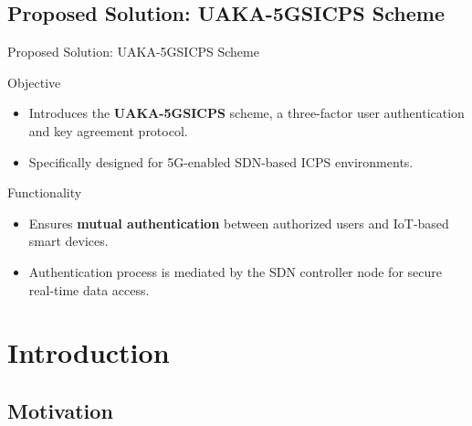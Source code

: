 \documentclass[9pt,handout]{beamer}
\begin{document}
\subsection{Proposed Solution: UAKA-5GSICPS Scheme}
\begin{frame}{Proposed Solution: UAKA-5GSICPS Scheme}

\begin{block}{Objective}
    \begin{itemize}
        \item Introduces the \textbf{UAKA-5GSICPS} scheme, a three-factor user authentication and key agreement protocol.
        \item Specifically designed for 5G-enabled SDN-based ICPS environments.
    \end{itemize}
\end{block}

\begin{block}{Functionality}
    \begin{itemize}
        \item Ensures \textbf{mutual authentication} between authorized users and IoT-based smart devices.
        \item Authentication process is mediated by the SDN controller node for secure real-time data access.
    \end{itemize}
\end{block}

\end{frame}


\section{Introduction}
\subsection{Motivation}
\end{document}
